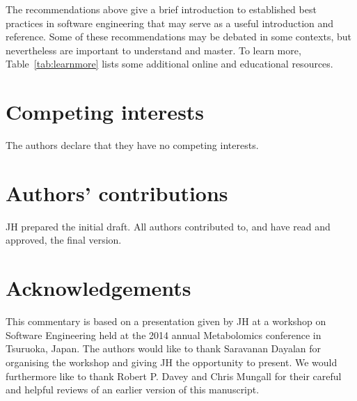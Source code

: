 \documentclass{bmcart}
\begin{document}
The recommendations above give a brief introduction to established best practices in software engineering that may serve as a useful introduction and reference. Some of these recommendations may be debated in some contexts, but nevertheless are important to understand and master. To learn more, Table~\ref{tab:learnmore} lists some additional online and educational resources. 


\begin{backmatter}

\section*{Competing interests}
  The authors declare that they have no competing interests.

\section*{Authors' contributions}
  JH prepared the initial draft. All authors contributed to, and have read and approved, the final version. 

\section*{Acknowledgements}
  This commentary is based on a presentation given by JH at a workshop on Software Engineering held at the 2014 annual Metabolomics conference in Tsuruoka, Japan. The authors would like to thank Saravanan Dayalan for organising the workshop and giving JH the opportunity to present. We would furthermore like to thank Robert P. Davey and Chris Mungall for their careful and helpful reviews of an earlier version of this manuscript. 


\end{backmatter}
\end{document}
